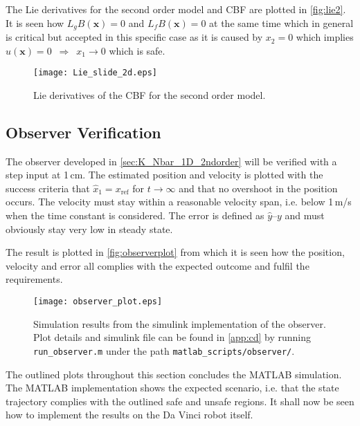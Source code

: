 The Lie derivatives for the second order model and CBF are plotted in \autoref{fig:lie2}.
It is seen how $L_gB(\mathbf{x}) = 0$ and $L_fB(\mathbf{x}) = 0$ at the same time which in general is critical but accepted in this specific case as it is caused by $x_2=0$ which implies $u(\mathbf{x})=0 \,\,\, \Rightarrow \,\,\, x_1 \rightarrow 0$ which is safe.
\begin{figure}[H]
\hspace{-7mm}
		\texttt{[image: Lie\_slide\_2d.eps]}
	\caption{Lie derivatives of the CBF for the second order model. }
	\label{fig:lie2}
\end{figure}
\subsection{Observer Verification}
The observer developed in \autoref{sec:K_Nbar_1D_2ndorder} will be verified with a step input at 1\,cm. The estimated position and velocity is plotted with the success criteria that $\hat{x}_1 = x_\text{ref}$ for $t \rightarrow \infty$ and that no overshoot in the position occurs. The velocity must stay within a reasonable velocity span, i.e. below 1\,m/s when the time constant is considered. The error is defined as $\hat{y}$--$y$ and must obviously stay very low in steady state.

The result is plotted in \autoref{fig:observerplot} from which it is seen how the position, velocity and error all complies with the expected outcome and fulfil the requirements.
\begin{figure}[H]
\hspace{-7mm}
		\texttt{[image: observer\_plot.eps]}
	\caption{Simulation results from the simulink implementation of the observer. Plot details and simulink file can be found in \autoref{app:cd} by running \texttt{run\_observer.m} under the path \texttt{matlab\_scripts/observer/}.}
	\label{fig:observerplot}
\end{figure}
The outlined plots throughout this section concludes the MATLAB simulation. The MATLAB implementation shows the expected scenario, i.e. that the state trajectory complies with the outlined safe and unsafe regions. It shall now be seen how to implement the results on the Da Vinci robot itself.

